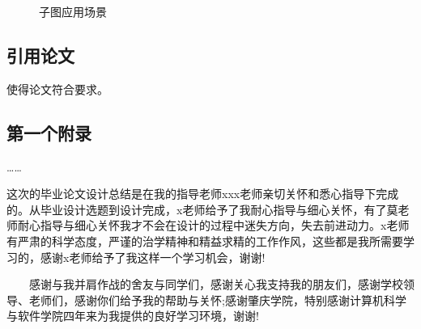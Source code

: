 \documentclass[bachelor,nocolorlinks]{seuthesis} %
\begin{document}
\begin{Main}
\begin{figure}
\centering
{}
\caption{子图应用场景}
\end{figure}

\section{引用论文}
使得论文符合要求\cite{Yao:2015ix}\cite{seucover}\cite{test1}\cite{test}\cite{R1}。

\end{Main} %


{}
\begin{Appendix}
  \chapter{第一个附录}
  ……
\end{Appendix}

\begin{Acknowledgement}{}
这次的毕业论文设计总结是在我的指导老师xxx老师亲切关怀和悉心指导下完成的。从毕业设计选题到设计完成，x老师给予了我耐心指导与细心关怀，有了莫老师耐心指导与细心关怀我才不会在设计的过程中迷失方向，失去前进动力。x老师有严肃的科学态度，严谨的治学精神和精益求精的工作作风，这些都是我所需要学习的，感谢x老师给予了我这样一个学习机会，谢谢!

　　感谢与我并肩作战的舍友与同学们，感谢关心我支持我的朋友们，感谢学校领导、老师们，感谢你们给予我的帮助与关怀;感谢肇庆学院，特别感谢计算机科学与软件学院四年来为我提供的良好学习环境，谢谢!
\end{Acknowledgement}

\newpage
\printindex %



%
%
\end{document}

